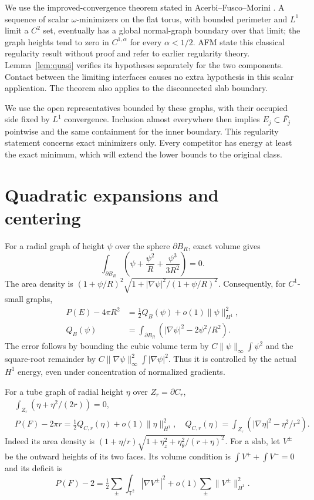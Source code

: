 \documentclass[11pt,reqno]{amsart}
\numberwithin{equation}{section}
\theoremstyle{definition}
\theoremstyle{remark}
\newcommand{\T}{\mathbb T}
\begin{document}
We use the improved-convergence theorem stated in
Acerbi--Fusco--Morini \cite[Definition 2.5 and Theorem 4.2]{AFM}.
A sequence of scalar $\omega$-minimizers on the flat torus, with
bounded perimeter and $L^1$ limit a $C^2$ set, eventually has a global
normal-graph boundary over that limit; the graph heights tend to zero
in $C^{1,\alpha}$ for every $\alpha<1/2$.
AFM state this classical regularity result without proof and refer to
earlier regularity theory. Lemma~\ref{lem:quasi} verifies its hypotheses
separately for the two components. Contact between the limiting
interfaces causes no extra hypothesis in this scalar application.
The theorem also applies to the disconnected slab boundary.

We use the open representatives bounded by these graphs, with their
occupied side fixed by $L^1$ convergence. Inclusion almost everywhere
then implies $E_j\subset\overline{F_j}$ pointwise and the same
containment for the inner boundary. This regularity statement concerns
exact minimizers only. Every competitor has energy at least the exact
minimum, which will extend the lower bounds to the original class.

\section{Quadratic expansions and centering}\label{sec:expansions}
For a radial graph of height $\psi$ over the sphere $\partial B_R$,
exact volume gives
\begin{equation}\label{eq:sphere-volume}
 \int_{\partial B_R}\left(\psi+\frac{\psi^2}{R}
 +\frac{\psi^3}{3R^2}\right)=0.
\end{equation}
The area density is
$(1+\psi/R)^2\sqrt{1+|\nabla\psi|^2/(1+\psi/R)^2}$.
Consequently, for $C^1$-small graphs,
\begin{align}
 P(E)-4\pi R^2&=\tfrac12 Q_B(\psi)+o(1)\|\psi\|_{H^1}^2,
 \label{eq:sphere-area}\\
 Q_B(\psi)&=\int_{\partial B_R}(|\nabla\psi|^2-2\psi^2/R^2).
 \nonumber
\end{align}
The error follows by bounding the cubic volume term by
$C\|\psi\|_\infty\int\psi^2$ and the square-root remainder by
$C\|\nabla\psi\|_\infty^2\int|\nabla\psi|^2$.
Thus it is controlled by the actual $H^1$ energy, even under
concentration of normalized gradients.

For a tube graph of radial height $\eta$ over $Z_r=\partial C_r$,
\begin{align}
 &\int_{Z_r}(\eta+\eta^2/(2r))=0,\label{eq:tube-volume}\\
 &P(F)-2\pi r=\tfrac12Q_{C,r}(\eta)+o(1)\|\eta\|_{H^1}^2,
 \quad Q_{C,r}(\eta)=\int_{Z_r}(|\nabla\eta|^2-\eta^2/r^2).
 \label{eq:tube-area}
\end{align}
Indeed its area density is
$(1+\eta/r)\sqrt{1+\eta_z^2+\eta_\theta^2/(r+\eta)^2}$.
For a slab, let $V^\pm$ be the outward heights of its two faces.
Its volume condition is $\int V^++\int V^-=0$ and its deficit is
\begin{equation}\label{eq:slab-area}
 P(F)-2=\tfrac12\sum_\pm\int_{\T^2}|\nabla V^\pm|^2
 +o(1)\sum_\pm\|V^\pm\|_{H^1}^2.
\end{equation}
\end{document}
